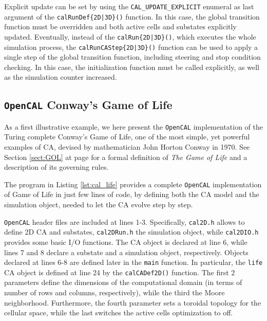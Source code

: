 Explicit update can be set by using the \verb'CAL_UPDATE_EXPLICIT' enumeral as last argument of the \verb'calRunDef{2D|3D}()' function. In this case, the global transition function must be overridden and both active cells and substates explicitly updated. Eventually, instead of the \verb'calRun{2D|3D}()', which executes the whole simulation process, the
\verb'calRunCAStep{2D|3D}()' function can be used to apply a single
step of the global transition function, including steering and stop
condition checking. In this case, the initialization function must
be called explicitly, as well as the simulation counter increased.




\subsection{\texttt{OpenCAL} Conway's Game of Life}
As a first illustrative example, we here present the \texttt{OpenCAL}
implementation of the Turing complete Conway's Game of Life\cite{gardner1970a}, one of the most simple, yet powerful examples of CA, devised by mathematician John Horton Conway in 1970. See Section \ref{sect:GOL} at page \pageref{sect:GOL} for a formal definition of \textit{The Game of Life} and a  description of its governing rules.

The program in Listing \ref{lst:cal_life} provides a complete
\texttt{OpenCAL} implementation of Game of Life in just few lines of code,
by defining both the CA model and the simulation object, needed to
let the CA evolve step by step.


\texttt{OpenCAL} header files are included at lines 1-3. Specifically,
\verb'cal2D.h' allows to define 2D CA and substates,
\verb'cal2DRun.h' the simulation object, while \verb'cal2DIO.h'
provides some basic I/O functions. The CA object is declared at
line 6, while lines 7 and 8 declare a substate and a simulation
object, respectively.  Objects declared at lines 6-8 are defined
later in the \verb'main' function. In particular, the \verb'life'
CA object is defined at line 24 by the \verb'calCADef2D()'
function. The first 2 parameters define the dimensions of the
computational domain (in terms of number of rows and columns,
respectively), while the third the Moore
neighborhood. Furthermore, the fourth parameter sets a toroidal
topology for the cellular space, while the last switches the
active cells optimization to off.

